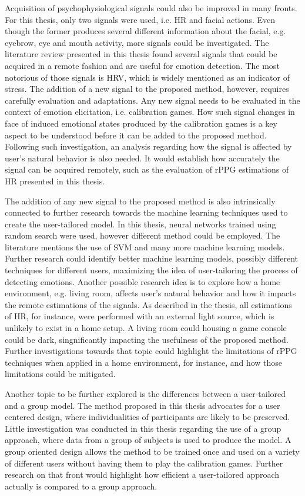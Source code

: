Acquisition of psychophysiological signals could also be improved in many fronts. For this thesis, only two signals were used, i.e. HR and facial actions. Even though the former produces several different information about the facial, e.g. eyebrow, eye and mouth activity, more signals could be investigated. The literature review presented in this thesis found several signals that could be acquired in a remote fashion and are useful for emotion detection. The most notorious of those signals is HRV, which is widely mentioned as an indicator of stress. The addition of a new signal to the proposed method, however, requires carefully evaluation  and adaptations. Any new signal needs to be evaluated in the context of emotion elicitation, i.e. calibration games. How such signal changes in face of induced emotional states produced by the calibration games is a key aspect to be understood before it can be added to the proposed method. Following such investigation, an analysis regarding how the signal is affected by user's natural behavior is also needed. It would establish how accurately the signal can be acquired remotely, such as the evaluation of rPPG estimations of HR presented in this thesis.

The addition of any new signal to the proposed method is also intrinsically connected to further research towards the machine learning techniques used to create the user-tailored model. In this thesis, neural networks trained using random search were used, however different method could be employed. The literature mentions the use of SVM and many more machine learning models. Further research could identify better machine learning models, possibly different techniques for different users, maximizing the idea of user-tailoring the process of detecting emotions. Another possible research idea is to explore how a home environment, e.g. living room, affects user's natural behavior and how it impacts the remote estimations of the signals. As described in the thesis, all estimations of HR, for instance, were performed with an external light source, which is unlikely to exist in a home setup. A living room could housing a game console could be dark, singnificantly impacting the usefulness of the proposed method. Further investigations towards that topic could highlight the limitations of rPPG techniques when applied in a home environment, for instance, and how those limitations could be mitigated.

Another topic to be further explored is the differences between a user-tailored and a group model. The method proposed in this thesis advocates for a user centered design, where individualities of participants are likely to be preserved. Little investigation was conducted in this thesis regarding the use of a group approach, where data from a group of subjects is used to produce the model. A group oriented design allows the method to be trained once and used on a variety of different users without having them to play the calibration games. Further research on that front would highlight how efficient a user-tailored approach actually is compared to a group approach.

